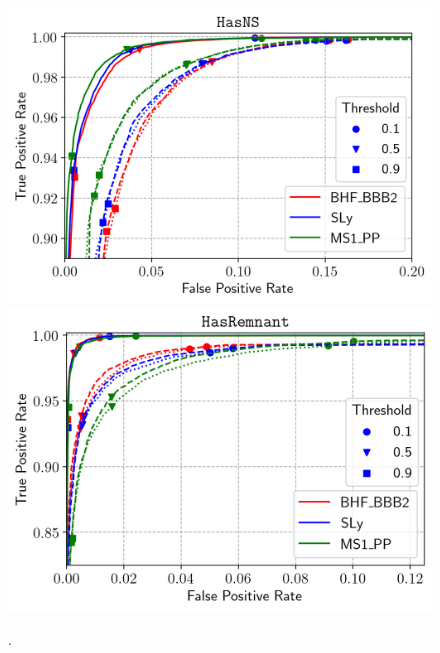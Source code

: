 \begin{figure}%
\includegraphics[width=0.47\linewidth]{ROC_O2testing_all_impl-NS}
\includegraphics[width=0.45\linewidth]{ROC_O2testing_all_impl-REM}
\caption{.}
\label{fig:rocO2_all}
\end{figure}




